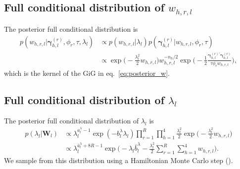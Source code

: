 \documentclass[12pt,a4paper]{article}
\newcommand*{\norm}[1]{\big\lVert#1\big\rVert}		%
\newcommand*\abs[1]{\big|#1\big|}					%
\theoremstyle{custom}
\begin{document}
\subsection{Full conditional distribution of $w_{h,r,l}$} \label{sec:posterior_w_hrl_hierarchical}
The posterior full conditional distribution is
\begin{align*}
p(w_{h,r,l}|\boldsymbol{\gamma}_{h,l}^{(r)},\phi_r,\tau,\lambda_l) & \propto p(w_{h,r,l}|\lambda_l) p(\boldsymbol{\gamma}_{h,l}^{(r)}|w_{h,r,l},\phi_r,\tau) \\
 & \propto \exp\Big( -\frac{\lambda_l^2}{2} w_{h,r,l} \Big) w_{h,r,l}^{-n_h/2} \exp\Big( -\frac{1}{2} \frac{\boldsymbol{\gamma}_{h,l}^{(r)\prime} \boldsymbol{\gamma}_{h,l}^{(r)}}{\tau \phi_r w_{h,r,l}} \Big) ,
\end{align*}
which is the kernel of the GiG in eq.~\eqref{eq:posterior_w}.



\subsection{Full conditional distribution of $\lambda_l$} \label{sec:posterior_lambda_l}
The posterior full conditional distribution of $\lambda_l$ is
\begin{align*}
p( \lambda_l | \mathbf{W}_l ) & \propto \lambda_l^{a_l^\lambda-1} \exp(-b_l^\lambda \lambda_l) \prod_{r=1}^R \prod_{h=1}^4 \frac{\lambda_l^2}{2} \exp\Big( -\frac{\lambda_l^2}{2} w_{h,r,l} \Big) \\
 & \propto \lambda_l^{\bar{a}_l^\lambda +8R -1} \exp\Big( -\lambda_l \bar{b}_l^\lambda -\frac{\lambda_l^2}{2}\sum_{r=1}^R \sum_{h=1}^4 w_{h,r,l} \Big).
\end{align*}
We sample from this distribution using a Hamiltonian Monte Carlo step (\cite{Neal11HamiltonianMC}).
\end{document}
